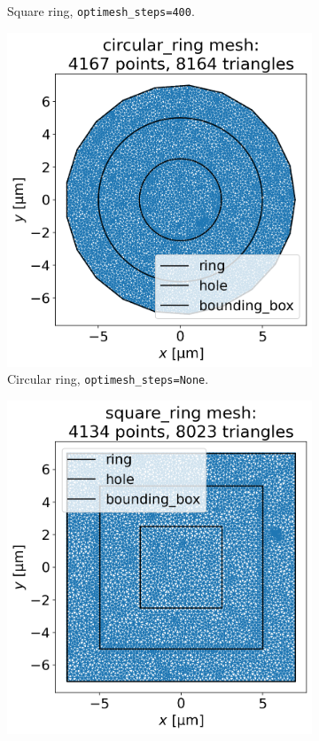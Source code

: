 \documentclass[preprint,12pt]{elsarticle}
\begin{document}
\begin{figure}
\begin{subfigure}{.4\textwidth}
  \caption{Square ring, \texttt{optimesh_steps=400}.}
  \label{fig:square_ring_mesh}
\end{subfigure}
\begin{subfigure}{.4\textwidth}
  \centering
  \includegraphics[width=\linewidth]{examples/images/ring/circular_ring_mesh_no_optimesh.png}
  \caption{Circular ring, \texttt{optimesh_steps=None}.}
  \label{fig:circular_ring_mesh_no_opt}
\end{subfigure}%
\begin{subfigure}{.4\textwidth}
  \centering
  \includegraphics[width=\linewidth]{examples/images/ring/square_ring_mesh_no_optimesh.png}

\end{subfigure}
\end{figure}
\end{document}
